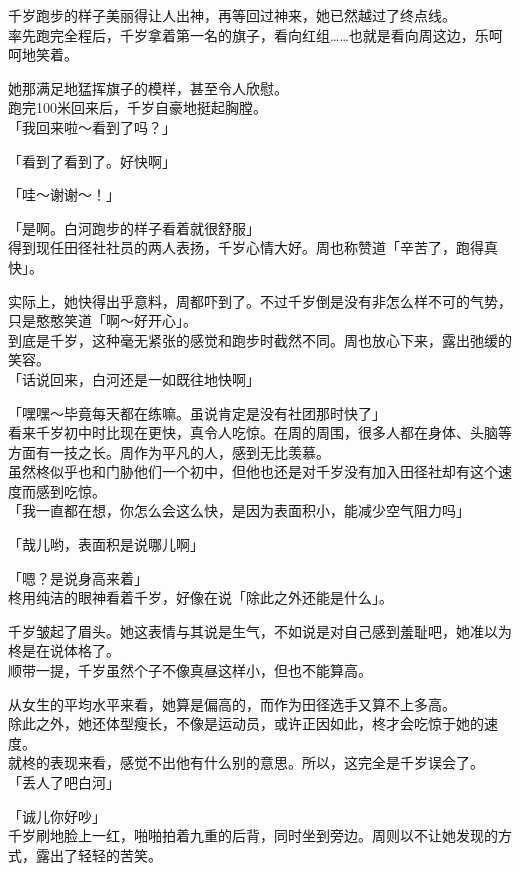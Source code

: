 千岁跑步的样子美丽得让人出神，再等回过神来，她已然越过了终点线。\\

率先跑完全程后，千岁拿着第一名的旗子，看向红组……也就是看向周这边，乐呵呵地笑着。

她那满足地猛挥旗子的模样，甚至令人欣慰。\\

跑完100米回来后，千岁自豪地挺起胸膛。\\

「我回来啦～看到了吗？」

「看到了看到了。好快啊」

「哇～谢谢～！」

「是啊。白河跑步的样子看着就很舒服」\\

得到现任田径社社员的两人表扬，千岁心情大好。周也称赞道「辛苦了，跑得真快」。

实际上，她快得出乎意料，周都吓到了。不过千岁倒是没有非怎么样不可的气势，只是憨憨笑道「啊～好开心」。\\

到底是千岁，这种毫无紧张的感觉和跑步时截然不同。周也放心下来，露出弛缓的笑容。\\

「话说回来，白河还是一如既往地快啊」

「嘿嘿～毕竟每天都在练嘛。虽说肯定是没有社团那时快了」\\

看来千岁初中时比现在更快，真令人吃惊。在周的周围，很多人都在身体、头脑等方面有一技之长。周作为平凡的人，感到无比羡慕。\\

虽然柊似乎也和门胁他们一个初中，但他也还是对千岁没有加入田径社却有这个速度而感到吃惊。\\

「我一直都在想，你怎么会这么快，是因为表面积小，能减少空气阻力吗」

「哉儿哟，表面积是说哪儿啊」

「嗯？是说身高来着」\\

柊用纯洁的眼神看着千岁，好像在说「除此之外还能是什么」。

千岁皱起了眉头。她这表情与其说是生气，不如说是对自己感到羞耻吧，她准以为柊是在说体格了。\\

顺带一提，千岁虽然个子不像真昼这样小，但也不能算高。

从女生的平均水平来看，她算是偏高的，而作为田径选手又算不上多高。\\

除此之外，她还体型瘦长，不像是运动员，或许正因如此，柊才会吃惊于她的速度。\\

就柊的表现来看，感觉不出他有什么别的意思。所以，这完全是千岁误会了。\\

「丢人了吧白河」

「诚儿你好吵」\\

千岁刷地脸上一红，啪啪拍着九重的后背，同时坐到旁边。周则以不让她发现的方式，露出了轻轻的苦笑。
